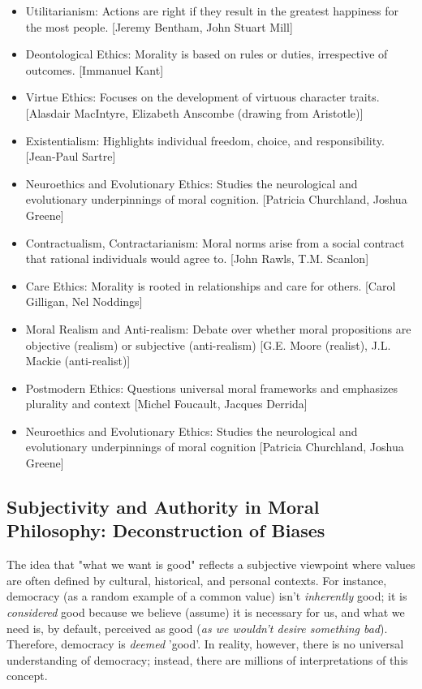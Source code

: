 \documentclass[11pt,a4]{article}
\begin{document}
        \begin{itemize}
            \item Utilitarianism: Actions are right if they result in the greatest happiness for the most people.
            [Jeremy Bentham, John Stuart Mill]
            \item Deontological Ethics: Morality is based on rules or duties, irrespective of outcomes. [Immanuel Kant]
            \item Virtue Ethics: Focuses on the development of virtuous character traits. [Alasdair MacIntyre, Elizabeth Anscombe (drawing from Aristotle)]
            \item Existentialism: Highlights individual freedom, choice, and responsibility. [Jean-Paul Sartre]
            \item Neuroethics and Evolutionary Ethics:  Studies the neurological and evolutionary underpinnings of moral cognition. [Patricia Churchland, Joshua Greene]
            \item Contractualism, Contractarianism: Moral norms arise from a social contract that rational individuals would agree to. [John Rawls, T.M. Scanlon]
            \item Care Ethics: Morality is rooted in relationships and care for others. [Carol Gilligan, Nel Noddings]
            \item Moral Realism and Anti-realism:
                 Debate over whether moral propositions are objective (realism) or subjective (anti-realism) [G.E. Moore (realist), J.L. Mackie (anti-realist)]
            \item Postmodern Ethics:
                 Questions universal moral frameworks and emphasizes plurality and context [Michel Foucault, Jacques Derrida]

            \item Neuroethics and Evolutionary Ethics:
                Studies the neurological and evolutionary underpinnings of moral cognition [Patricia Churchland, Joshua Greene]


        \end{itemize}

\subsection{Subjectivity and Authority in Moral Philosophy: Deconstruction of Biases}
    The idea that "what we want is good" reflects a subjective viewpoint
    where values are often defined by cultural, historical, and personal
    contexts. For instance, democracy (as a random example of a common value) isn't \textit{inherently} good; it
    is \textit{considered} good because we
    believe (assume) it is necessary for us, and what we need is, by
    default, perceived as good (\textit{as we wouldn't desire something
    bad}). Therefore, democracy is \textit{deemed} 'good'. In reality,
    however, there is no universal understanding of democracy;
    instead, there are millions of interpretations of this concept.
\end{document}
